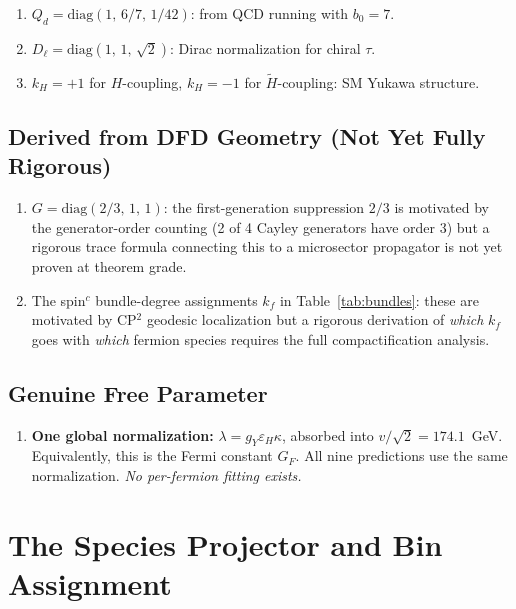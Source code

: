 \documentclass[11pt,a4paper]{article}
\begin{document}
\begin{enumerate}
\item $Q_d = \mathrm{diag}(1,\,6/7,\,1/42)$: from QCD running with $b_0=7$.
\item $D_\ell = \mathrm{diag}(1,\,1,\,\sqrt{2})$: Dirac normalization for chiral $\tau$.
\item $k_H = +1$ for $H$-coupling, $k_H = -1$ for $\widetilde{H}$-coupling: SM Yukawa structure.
\end{enumerate}

\subsection{Derived from DFD Geometry (Not Yet Fully Rigorous)}

\begin{enumerate}
\item $G = \mathrm{diag}(2/3,\,1,\,1)$: the first-generation suppression $2/3$
      is motivated by the generator-order counting (2 of 4 Cayley generators have
      order 3) but a rigorous trace formula connecting this to a microsector
      propagator is not yet proven at theorem grade.
\item The spin$^c$ bundle-degree assignments $k_f$ in Table~\ref{tab:bundles}:
      these are motivated by CP$^2$ geodesic localization but a rigorous derivation
      of \emph{which} $k_f$ goes with \emph{which} fermion species requires the
      full compactification analysis.
\end{enumerate}

\subsection{Genuine Free Parameter}

\begin{enumerate}
\item \textbf{One global normalization:} $\lambda = g_Y\varepsilon_H\kappa$, absorbed
      into $v/\sqrt{2} = 174.1$~GeV.  Equivalently, this is the Fermi constant $G_F$.
      All nine predictions use the same normalization.  \emph{No per-fermion fitting exists.}
\end{enumerate}


\section{The Species Projector and Bin Assignment}
\label{sec:projector}
\end{document}

